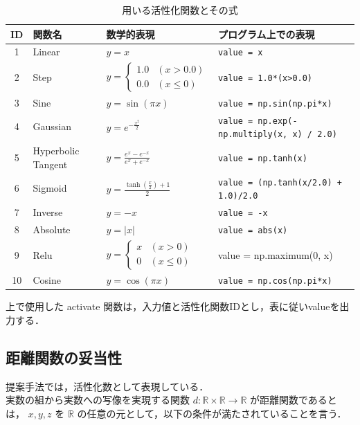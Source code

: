 \begin{table}[H]
    \caption{用いる活性化関数とその式}
    \centering
    \begin{tabular}{clll}
        \hline
        ID & 関数名 & 数学的表現 & プログラム上での表現 \\
        \hline \hline
        1 & Linear & $ y = x $ & \texttt{value = x} \\
        2 & Step & $ y = \begin{cases}
            1.0 & (x > 0.0) \\
            0.0 & (x \leq 0)
            \end{cases} $ & \texttt{value = 1.0*(x>0.0)} \\
        3 & Sine & $ y = \sin(\pi x) $ & \texttt{value = np.sin(np.pi*x)} \\
        4 & Gaussian & $ y = e^{-\frac{x^2}{2}} $ & \texttt{value = np.exp(-np.multiply(x, x) / 2.0)} \\
        5 & Hyperbolic Tangent & $ y = \frac{e^{x} - e^{-x}}{e^{x} + e^{-x}} $ & \texttt{value = np.tanh(x)} \\
        6 & Sigmoid & $ y = \frac{\tanh\left(\frac{x}{2}\right) + 1}{2} $ & \texttt{value = (np.tanh(x/2.0) + 1.0)/2.0} \\
        7 & Inverse & $ y = -x $ & \texttt{value = -x} \\
        8 &Absolute & $ y = |x| $ & \texttt{value = abs(x)} \\
        9 & Relu & $ y = 
        \begin{cases}
        x & (x > 0)\\
        0 & (x \leq 0)
        \end{cases} $ & value = np.maximum(0, x) \\
        10 & Cosine & $ y = \cos(\pi x) $ & \texttt{value = np.cos(np.pi*x)} \\
        \hline
    \end{tabular}
\end{table}

上で使用した activate 関数は，入力値と活性化関数IDとし，表に従いvalueを出力する．

\clearpage
\subsection{距離関数の妥当性}
提案手法では，活性化数として表現している． \\
実数の組から実数への写像を実現する関数 $ d: \mathbb{R} \times \mathbb{R} \rightarrow \mathbb{R} $ が距離関数であるとは， $ x, y, z $ を $ \mathbb{R} $ の任意の元として，以下の条件が満たされていることを言う\cite{距離関数}．

